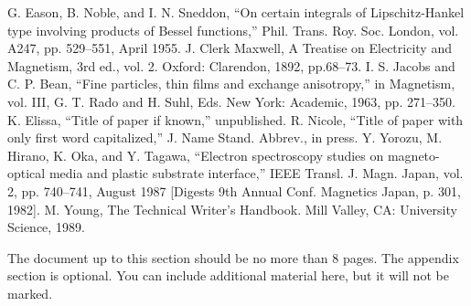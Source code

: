 \documentclass[conference]{IEEEtran}
\begin{document}
	\begin{thebibliography}{00}
		 G. Eason, B. Noble, and I. N. Sneddon, ``On certain integrals of Lipschitz-Hankel type involving products of Bessel functions,'' Phil. Trans. Roy. Soc. London, vol. A247, pp. 529--551, April 1955.
		 J. Clerk Maxwell, A Treatise on Electricity and Magnetism, 3rd ed., vol. 2. Oxford: Clarendon, 1892, pp.68--73.
		 I. S. Jacobs and C. P. Bean, ``Fine particles, thin films and exchange anisotropy,'' in Magnetism, vol. III, G. T. Rado and H. Suhl, Eds. New York: Academic, 1963, pp. 271--350.
		 K. Elissa, ``Title of paper if known,'' unpublished.
		 R. Nicole, ``Title of paper with only first word capitalized,'' J. Name Stand. Abbrev., in press.
		 Y. Yorozu, M. Hirano, K. Oka, and Y. Tagawa, ``Electron spectroscopy studies on magneto-optical media and plastic substrate interface,'' IEEE Transl. J. Magn. Japan, vol. 2, pp. 740--741, August 1987 [Digests 9th Annual Conf. Magnetics Japan, p. 301, 1982].
		 M. Young, The Technical Writer's Handbook. Mill Valley, CA: University Science, 1989.
	\end{thebibliography}
	
	\appendix
	{\color{blue}The document up to this section should be no more than 8 pages. The appendix section is optional. You can include additional material here, but it will not be marked.}
	
\end{document}
